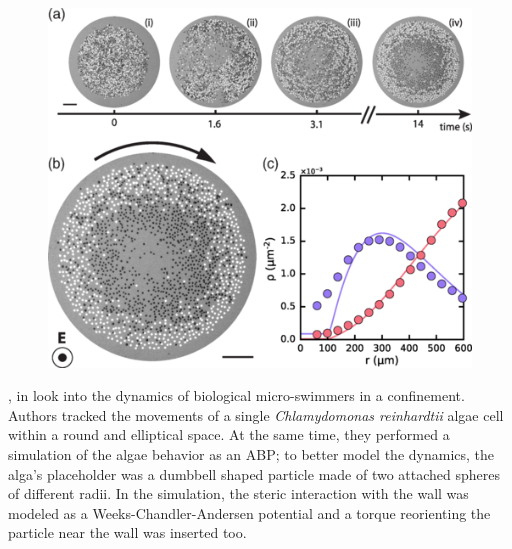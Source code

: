 \documentclass[../../master_thesis_np.tex]{subfiles}
\begin{document}
	\begin{figure}[htp]
		\centering
		\includegraphics[width=\singfigwidth]{maity1.png}
		\caption{\cite{maity_spontaneous_2023}}
		\label{fig:maity1}
	\end{figure}
	
	\citeauthor{ostapenko_curvature-guided_2018}, in \cite{ostapenko_curvature-guided_2018} look into the dynamics of biological micro-swimmers in a confinement. 
	Authors tracked the movements of a single \emph{Chlamydomonas reinhardtii} algae cell within a round and elliptical space. 
	At the same time, they performed a simulation of the algae behavior as an ABP; to better model the dynamics, the alga's placeholder was a dumbbell shaped particle made of two attached spheres of different radii. 
	In the simulation, the steric interaction with the wall was modeled as a Weeks-Chandler-Andersen potential and a torque reorienting the particle near the wall was inserted too.
	
\end{document}
